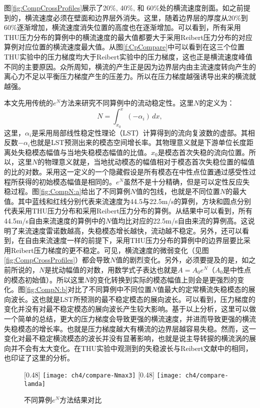 图\ref{fig:CompCrossProfiles}展示了20\%, 40\%, 和 60\%处的横流速度剖面。如之前提到的，横流速度必须在壁面和边界层外消失。这里，随着边界层的厚度从20\%到60\%逐渐增加，横流速度消失位置的高度也在逐渐增加。可以看到，所有采用THU压力分布的算例中的横流速度的最大值都要大于采用Reibert压力分布的对应算例对应位置的横流速度最大值。从图\ref{f:CpCompare}中可以看到在这三个位置THU实验中的压力梯度均大于Reibert实验中的压力梯度，这也正是横流速度峰值不同的主要原因。众所周知，横流的产生正是因为边界层内由主流速度转向产生的离心力不足以平衡压力梯度产生的压差力。所以在压力梯度越强诱导出来的横流就越强。

本文先用传统的$e^N$方法来研究不同算例中的流动稳定性。这里$N$的定义为：
\begin{equation}\label{e:eNdef}
  N=\int_{x_0}^x( -\alpha_i)\,dx,
\end{equation}
这里，$\alpha_i$是采用局部线性稳定性理论（LST）计算得到的流向复波数的虚部。其相反数$-\alpha_i$也就是LST预测出来的模态空间增长率。其物理意义就是下游单位长度距离处失稳模态幅值与当地失稳模态幅值的比值。$x_0$是模态首次失稳的流向位置。所以，这里$N$的物理意义就是，当地扰动模态的幅值相对于模态首次失稳位置的幅值的比的对数。采用这一定义的一个隐藏假设是所有模态在中性点位置通过感受性过程所获得的初始模态幅值是相同的。$e^N$虽然不是十分精确，但是可以定性反应失稳过程。图\ref{fig:CompN:a}给出了不同算例$N$值的包线，也就是不同位置$N$的最大值。其中蓝线和红线分别代表来流速度为44.5与22.5m/s的算例，方块和圆点分别代表采用THU压力分布和采用Reibert压力分布的算例。从结果中可以看到，所有44.5m/s自由来流速度的算例中的$N$值均比对应的22.5m/s自由来流的算例高。这说明了来流速度雷诺数越高，失稳模态增长越快，流动越不稳定。另外，还可以看到，在自由来流速度一样的前提下，采用THU压力分布的算例中的边界层要比采用Reibert压力梯度的更不稳定。可见，横流速度的微弱变化（见图\ref{fig:CompCrossProfiles}）都会导致$N$值的剧烈变化。另外，必须要提及的是，如之前所说的，$N$是扰动幅值的对数，用数学式子表达也就是$A=A_0e^{N}$（$A_0$是中性点的模态初始值）。所以这里$N$的变化转换到实际的模态幅值上则会是更强烈的变化。图\ref{fig:CompN:b}对比了不同算例中不同位置$N$值最大的定常横流失稳模态的展向波长。这也就是LST所预测的最不稳定模态的展向波长。可以看到，压力梯度的变化并没有对最不稳定模态的展向波长产生较大影响。基于以上分析，这里可以做一个简单的总结，更大的压力梯度会导致更强的横流速度，并进而导致更强的横流失稳模态的增长率。也就是压力梯度越大有横流的边界层越容易失稳。然而，这一变化对最不稳定横流模态的波长并没有显著影响，也就是说主导转捩的横流涡的展向并不会有太大变化。在THU实验中观测到的失稳波长与Reibert文献中的相同，也印证了这里的分析。
\begin{figure}
\centering
{} [0.48\linewidth]%
{\texttt{[image: ch4/compare-Nmax3]}}
 [0.48\linewidth] %
{\texttt{[image: ch4/compare-lamda]}}
\caption{不同算例$e^{N}$方法结果对比}
\label{fig:CompN} %
\end{figure}

